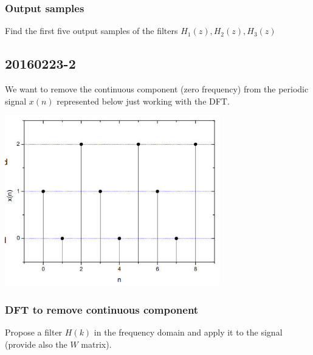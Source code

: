     \subsubsection{Output samples}
    Find the first five output samples of the filters $H_1(z),H_2(z),H_3(z)$


\pagebreak\subsection{20160223-2}
    We want to remove the continuous component (zero frequency) from the periodic signal $x(n)$ represented below just working with the DFT.
    \begin{center}
        \includegraphics[width=0.7\textwidth]{images/20160223_05.png}
    \end{center}

    \subsubsection{DFT to remove continuous component}
    Propose a filter $H(k)$ in the frequency domain and apply it to the signal (provide also the $W$ matrix).


